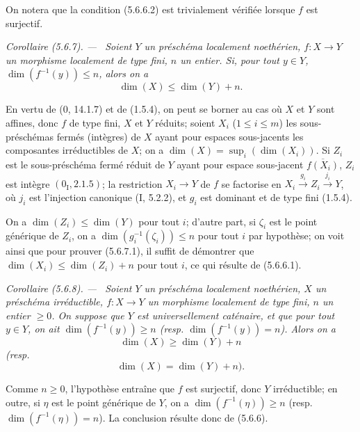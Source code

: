 \documentclass[10pt,oneside]{book}
\newcommand{\oldpage}[2][]{%
  \setcounter{footnote}{0}%
  \marginpar{\scriptsize\textbf{#1}~|~#2}\ignorespaces}
\newenvironment{corollary}[1][]{%
  \par\medskip\noindent\itshape Corollaire (#1). ---\ }{\par}
\begin{document}
On notera que la condition (5.6.6.2) est trivialement vérifiée lorsque $f$
est surjectif.

\begin{corollary}[5.6.7]
\label{IV.2.s5.6.7-fr}
Soient $Y$ un préschéma localement noethérien, $f:X\to Y$ un morphisme
localement de type fini, $n$ un entier. Si, pour tout $y\in Y$,
$\dim(f^{-1}(y))\leq n$, alors on a
\begin{equation}
\dim(X)\leq\dim(Y)+n.
\tag{5.6.7.1}\label{IV.2.s5.6.7.1-fr}
\end{equation}
\end{corollary}

En vertu de (0, 14.1.7) et de (1.5.4), on peut se borner au cas où $X$ et
$Y$ sont affines, donc $f$ de type fini, $X$ et $Y$ réduits; soient $X_i$
($1\leq i\leq m$) les sous-préschémas fermés (intègres) de $X$ ayant pour
espaces sous-jacents les composantes irréductibles de $X$; on a
$\dim(X)=\sup_i(\dim(X_i))$. Si $Z_i$ est le sous-préschéma fermé réduit de
$Y$ ayant pour espace sous-jacent $\overline{f(X_i)}$, $Z_i$ est intègre
$(0_{\mathrm I},2.1.5)$; la restriction $X_i\to Y$ de $f$ se factorise en
$X_i\xrightarrow{g_i}Z_i\xrightarrow{j_i}Y$, où $j_i$ est l'injection
canonique (I, 5.2.2), et $g_i$ est dominant et de type fini (1.5.4).

\oldpage[IV-2]{101}

On a $\dim(Z_i)\leq\dim(Y)$ pour tout $i$; d'autre part, si $\zeta_i$ est le
point générique de $Z_i$, on a $\dim(g_i^{-1}(\zeta_i))\leq n$ pour tout $i$
par hypothèse; on voit ainsi que pour prouver (5.6.7.1), il suffit de
démontrer que $\dim(X_i)\leq\dim(Z_i)+n$ pour tout $i$, ce qui résulte de
(5.6.6.1).

\begin{corollary}[5.6.8]
\label{IV.2.s5.6.8-fr}
Soient $Y$ un préschéma localement noethérien, $X$ un préschéma
irréductible, $f:X\to Y$ un morphisme localement de type fini, $n$ un entier
$\geq0$. On suppose que $Y$ est universellement caténaire, et que pour tout
$y\in Y$, on ait $\dim(f^{-1}(y))\geq n$ (resp.
$\dim(f^{-1}(y))=n$). Alors on a
\begin{equation}
\dim(X)\geq\dim(Y)+n
\tag{5.6.8.1}\label{IV.2.s5.6.8.1-fr}
\end{equation}
(resp.
\begin{equation}
\dim(X)=\dim(Y)+n).
\tag{5.6.8.2}\label{IV.2.s5.6.8.2-fr}
\end{equation}
\end{corollary}

Comme $n\geq0$, l'hypothèse entraîne que $f$ est surjectif, donc $Y$
irréductible; en outre, si $\eta$ est le point générique de $Y$, on a
$\dim(f^{-1}(\eta))\geq n$ (resp. $\dim(f^{-1}(\eta))=n$). La conclusion
résulte donc de (5.6.6).
\end{document}
